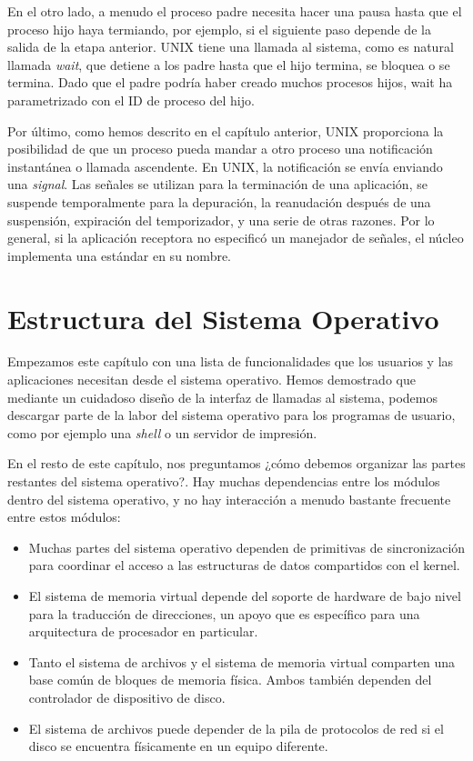 \documentclass[10pt]{book}
\begin{document}
En el otro lado, a menudo el proceso padre necesita hacer una pausa hasta que el proceso hijo haya termiando, por ejemplo, si el siguiente paso depende de la salida de la etapa anterior. UNIX tiene una llamada al sistema, como es natural llamada \textit{wait}, que detiene a los padre hasta que el hijo termina, se bloquea o se termina. Dado que el padre podría haber creado muchos procesos hijos, wait ha parametrizado con el ID de proceso del hijo.

Por último, como hemos descrito en el capítulo anterior, UNIX proporciona la posibilidad de que un proceso pueda mandar a otro proceso una notificación instantánea o llamada ascendente. En UNIX, la notificación se envía enviando una \textit{signal}. Las señales se utilizan para la terminación de una aplicación, se suspende temporalmente para la depuración, la reanudación después de una suspensión, expiración del temporizador, y una serie de otras razones. Por lo general, si la aplicación receptora no especificó un manejador de señales, el núcleo implementa una estándar en su nombre.

\section{Estructura del Sistema Operativo}
Empezamos este capítulo con una lista de funcionalidades que los usuarios y las aplicaciones necesitan desde el sistema operativo. Hemos demostrado que mediante un cuidadoso diseño de la interfaz de llamadas al sistema, podemos descargar parte de la labor del sistema operativo para los programas de usuario, como por ejemplo una \textit{shell} o un servidor de impresión.

En el resto de este capítulo, nos preguntamos ¿cómo debemos organizar las partes restantes del sistema operativo?. Hay muchas dependencias entre los módulos dentro del sistema operativo, y no hay interacción a menudo bastante frecuente entre estos módulos:

\begin{itemize}
\item Muchas partes del sistema operativo dependen de primitivas de sincronización para coordinar el acceso a las estructuras de datos compartidos con el kernel.
\item El sistema de memoria virtual depende del soporte de hardware de bajo nivel para la traducción de direcciones, un apoyo que es específico para una arquitectura de procesador en particular.
\item Tanto el sistema de archivos y el sistema de memoria virtual comparten una base común de bloques de memoria física. Ambos también dependen del controlador de dispositivo de disco.
\item El sistema de archivos puede depender de la pila de protocolos de red si el disco se encuentra físicamente en un equipo diferente.
\end{itemize}
\end{document}
